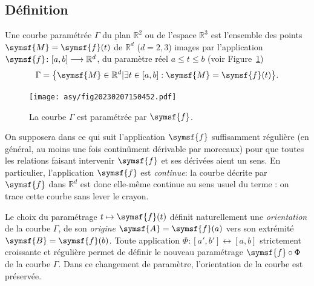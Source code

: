 \documentclass[
  a4paper,
  DIV=11,
  numbers=noendperiod]{scrreprt}
\newcommand{\point}[1]{\symsf{#1}}
\newcommand{\reals}{\mathbb R}
\begin{document}
\hypertarget{duxe9finition-1}{%
\subsection{Définition}\label{duxe9finition-1}}

Une courbe paramétrée \(\Gamma\) du plan \(\reals^2\) ou de l'espace
\(\reals^3\) est l'ensemble des points \(\point{M} = \point{f}(t)\) de
\(\reals^d\) (\(d = 2, 3\)) images par l'application
\(\point{f} \colon [a, b] \longrightarrow \reals^d\), du paramètre réel
\(a \leq t \leq b\) (voir Figure~\ref{fig-20230207150452}) \[
\Gamma = \bigl\{ \point{M} \in \reals^d | \exists t \in [a, b]: \point{M} = \point{f}(t) \bigr\}.
\]

\begin{figure}

{\centering \texttt{[image: asy/fig20230207150452.pdf]}

}

\caption{\label{fig-20230207150452}La courbe \(\Gamma\) est paramétrée
par \(\point{f}\).}

\end{figure}

On supposera dans ce qui suit l'application \(\point{f}\) suffisamment
régulière (en général, au moins une fois continûment dérivable par
morceaux) pour que toutes les relations faisant intervenir \(\point{f}\)
et ses dérivées aient un sens. En particulier, l'application
\(\point{f}\) est \emph{continue}: la courbe décrite par \(\point{f}\)
dans \(\reals^d\) est donc elle-même continue au sens usuel du terme :
on trace cette courbe sans lever le crayon.

Le choix du paramétrage \(t \mapsto \point{f}(t)\) définit naturellement
une \emph{orientation} de la courbe \(\Gamma\), de son \emph{origine}
\(\point{A} = \point{f}(a)\) vers son extrémité
\(\point{B} = \point{f}(b)\). Toute application
\(\Phi\colon [a', b'] \longleftrightarrow [a, b]\) strictement
croissante et régulière permet de définir le nouveau paramétrage
\(\point{f} \circ \Phi\) de la courbe \(\Gamma\). Dans ce changement de
paramètre, l'orientation de la courbe est préservée.
\end{document}
